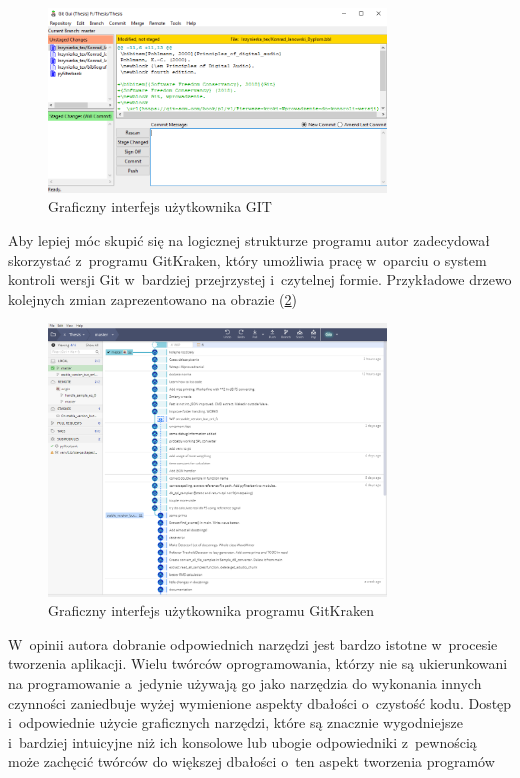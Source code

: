 \documentclass[eng,printmode]{mgr}
\begin{document}
\begin{figure}[hbtp]  
	\caption{Graficzny interfejs użytkownika GIT}
	\label{git_gui}   
	\centering
	\includegraphics[width=0.8\textwidth]{git_gui.PNG}
\end{figure} 
 
Aby lepiej móc skupić się na logicznej strukturze programu autor zadecydował skorzystać z~programu GitKraken, który umożliwia pracę w~oparciu o system kontroli wersji Git w~bardziej przejrzystej i~czytelnej formie. Przykładowe drzewo kolejnych zmian zaprezentowano na obrazie (\ref{GitKraken})

\begin{figure}[hbtp]
\label{GitKraken}
\caption{Graficzny interfejs użytkownika programu GitKraken}
\centering
\includegraphics[width=0.8\textwidth]{GitKraken.PNG}
\end{figure}

W~opinii autora dobranie odpowiednich narzędzi jest bardzo istotne w~procesie tworzenia aplikacji. Wielu twórców oprogramowania, którzy nie są ukierunkowani na programowanie a~jedynie używają go jako narzędzia do wykonania innych czynności zaniedbuje wyżej wymienione aspekty dbałości o~czystość kodu. Dostęp i~odpowiednie użycie graficznych narzędzi, które są znacznie wygodniejsze i~bardziej intuicyjne niż ich konsolowe lub ubogie odpowiedniki z~pewnością może zachęcić twórców do większej dbałości o~ten aspekt tworzenia programów
\end{document}
